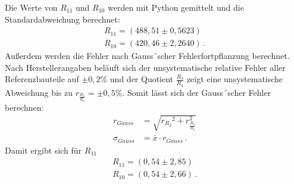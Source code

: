 Die Werte von $R_{11}$ und $R_{10}$ werden mit Python gemittelt und die Standardabweichung berechnet:
\begin{align*}
    R_{11} = (488,51 \pm 0,5623) \\ %
    R_{10} = (420,46 \pm 2,2640) \,. %
\end{align*}
Außerdem werden die Fehler nach Gauss´scher Fehlerfortpflanzung berechnet.
Nach Herstellerangaben beläuft sich der unsystematische relative Fehler aller
Referenzbauteile auf $\pm 0,2 \%$ und der Quotient $\frac{R_3}{R_4}$ zeigt eine
unsystematische Abweichung bis zu $r_{\frac{R_3}{R_4}} = \pm 0,5 \%$.
Somit lässt sich der Gauss´scher Fehler berechnen:
\begin{align*}
    r_{Gauss} & = \sqrt{{r_{R_2}}^2 + r_{\frac{R_3}{R_4}}^2} \\
    \sigma_{Gauss} & = \bar{x} \cdot r_{Gauss} \,.
\end{align*}
Damit ergibt sich für $R_{11}$
\begin{align*}
  R_{11} = (0,54 \pm 2,85) \\
  R_{10} = (0,54 \pm 2,66) \,.
\end{align*}
\label{sec:abschnitt}
